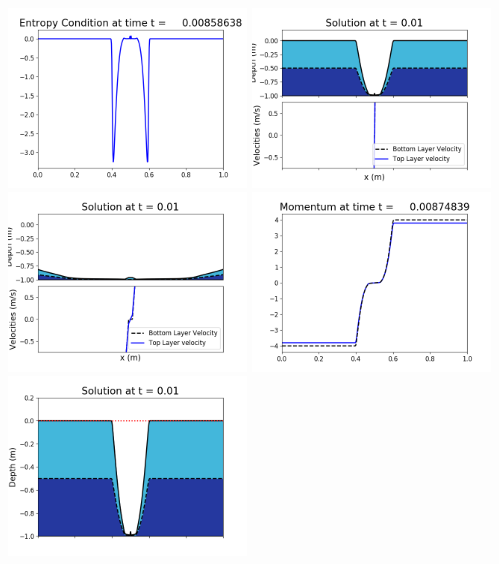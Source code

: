 \documentclass[11pt]{article}
\begin{document}
\vskip 10pt 
\includegraphics[width=0.475\textwidth]{frame0054fig1009.png}
\vskip 10pt 
\includegraphics[width=0.475\textwidth]{frame0055fig1001.png}
\includegraphics[width=0.475\textwidth]{frame0055fig1002.png}
\vskip 10pt 
\includegraphics[width=0.475\textwidth]{frame0055fig1003.png}
\includegraphics[width=0.475\textwidth]{frame0055fig1006.png}
\end{document}
